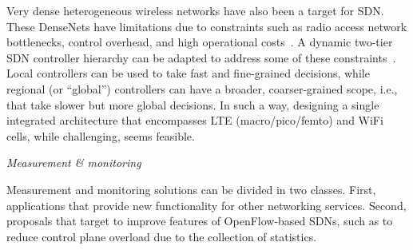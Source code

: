 
Very dense heterogeneous wireless networks have also been a target for SDN.
These DenseNets have limitations due to constraints 
such as radio access network bottlenecks, control overhead, and high operational costs~\cite{ali-ahmad2013}.
A dynamic two-tier SDN controller hierarchy can be adapted to address some of these constraints~\cite{ali-ahmad2013}. Local controllers can be used to take fast and fine-grained decisions, while regional 
(or ``global'') controllers can have a broader, coarser-grained scope, i.e., that take slower but more 
global decisions.
In such a way, designing a single integrated architecture that encompasses LTE (macro/pico/femto) and WiFi 
cells, while challenging, seems feasible. 

\vspace{2mm}
\noindent \textit{Measurement \& monitoring}

Measurement and monitoring solutions can be divided in two classes. First, applications that provide new 
functionality for other networking services. Second, proposals that target to improve features of OpenFlow-based SDNs, 
such as to reduce control plane overload due to the collection of statistics.

